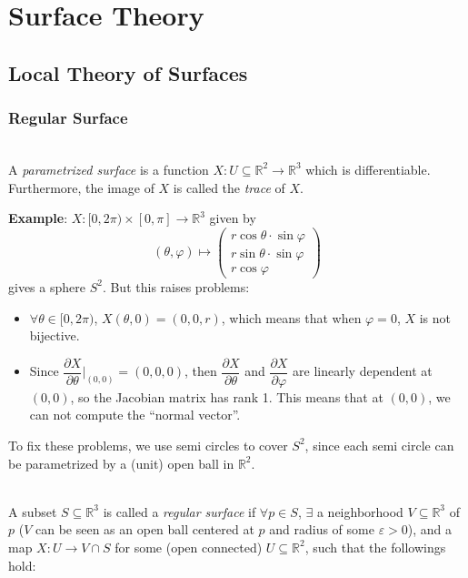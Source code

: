 \chapter{Surface Theory}

\section{Local Theory of Surfaces}

\subsection{Regular Surface}

\\
A \textit{parametrized surface} is a function $X: U\subseteq\mathbb{R}^2\to\mathbb{R}^3$ which is differentiable. Furthermore, the image of $X$ is called the \textit{trace} of $X$.

\noindent\textbf{Example}: $X: [0, 2\pi)\times[0, \pi]\to\mathbb{R}^3$ given by
\[
(\theta, \varphi)\longmapsto\begin{pmatrix} r\cos\theta\cdot\sin\varphi\\ r\sin\theta\cdot\sin\varphi\\ r\cos\varphi \end{pmatrix}
\]
gives a sphere $S^2$. But this raises problems:

\noindent\begin{itemize}
\item $\forall\theta\in[0, 2\pi)$, $X(\theta, 0) = (0, 0, r)$, which means that when $\varphi = 0$, $X$ is not bijective.
\item Since $\dfrac{\partial X}{\partial\theta}\bigg|_{(0,0)} = (0,0,0)$, then $\dfrac{\partial X}{\partial\theta}$ and $\dfrac{\partial X}{\partial\varphi}$ are linearly dependent at $(0,0)$, so the Jacobian matrix has rank 1. This means that at $(0,0)$, we can not compute the ``normal vector''.
\end{itemize}

\noindent To fix these problems, we use semi circles to cover $S^2$, since each semi circle can be parametrized by a (unit) open ball in $\mathbb{R}^2$.

\\
A subset $S\subseteq\mathbb{R}^3$ is called a \textit{regular surface} if $\forall p\in S$, $\exists$ a neighborhood $V\subseteq\mathbb{R}^3$ of $p$ ($V$ can be seen as an open ball centered at $p$ and radius of some $\varepsilon > 0$), and a map $X: U\to V\cap S$ for some (open connected) $U\subseteq\mathbb{R}^2$, such that the followings hold:

